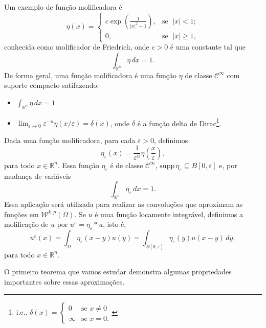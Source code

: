 \documentclass[a4paper, 11pt]{book}
\theoremstyle{definition}
\newcommand{\bR}{\mathbb{R}}
\newcommand{\cC}{\mathcal{C}}
\newcommand{\cW}{\mathcal{W}}
\newcommand{\supp}{\mathrm{supp}\,}
\begin{document}
Um exemplo de função molificadora é
\begin{equation} \label{eq:molificador-friedrich}
    \eta(x) =
    \left\{
        \begin{array}{lr}
            c \exp \left( \frac{1}{|x|^2 - 1} \right), &\! \text{se }\; |x| < 1;\\
            0, &\!\text{se }\; |x| \geqslant 1,
        \end{array}
    \right.
\end{equation}
conhecida como molificador de Friedrich, onde $c > 0$ é uma constante tal que
\[
    \int_{\bR^n} \eta \,dx = 1.
\]
De forma geral, uma função molificadora é uma função $\eta$ de classe $\cC^\infty$ com suporte compacto satifazendo:
\begin{itemize}[leftmargin=*, label=\small{$\bullet$}]
    \item $\displaystyle \int_{\bR^n} \eta \,dx = 1$
    \item $\displaystyle \lim_{\varepsilon \to 0} \varepsilon^{-n}\eta(x/\varepsilon) = \delta(x)$, onde $\delta$ é a função delta de Dirac\footnote{i.e., $\delta(x) = 
    \left\{  
        \begin{array}{ll}
            0 &\text{se } x \neq 0\\
            \infty &\text{se } x = 0.
        \end{array}
    \right.
    $}.
\end{itemize}
Dada uma função molificadora, para cada $\varepsilon > 0$, definimos
\begin{equation} \label{eq:eta-epsilon}
    \eta_\varepsilon(x) = \frac{1}{\varepsilon^n} \eta\left( \frac{x}{\varepsilon} \right), 
\end{equation}
para todo $x \in \bR^n$. Essa função $\eta_\varepsilon$ é de classe $\cC^\infty$, $\supp \eta_\varepsilon \subseteq B[0,\varepsilon]$ e, por mudança de variáveis
\begin{equation} \label{eq:integral1}
    \int_{\bR^n} \eta_\varepsilon \,dx = 1.
\end{equation}
Essa aplicação será utilizada para realizar as convoluções que aproximam as funções em $\cW^{k,p}(\Omega)$. Se $u$ é uma função locamente integrável, definimos a molificação de $u$ por $u^\varepsilon = \eta_\varepsilon * u$, isto é,
\[
    u^\varepsilon(x) = \int_\Omega \eta_\varepsilon(x-y) u(y) = \int_{B[0,\varepsilon]} \eta_\varepsilon(y) u(x-y) \,dy,
\]
para todo $x \in \bR^n$.

O primeiro teorema que vamos estudar demonstra algumas propriedades importantes sobre essas aproximações.
\end{document}
